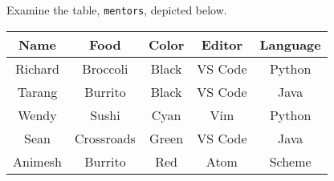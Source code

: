 Examine the table, \texttt{mentors}, depicted below.

\begin{center}
\begin{tabular}{|c|c|c|c|c|}
 \hline
 \textbf{Name} & \textbf{Food} & \textbf{Color} & \textbf{Editor} & \textbf{Language} \\
 \hline
 Richard & Broccoli & Black & VS Code & Python \\
 \hline
 Tarang & Burrito & Black & VS Code & Java \\
 \hline
 Wendy & Sushi & Cyan & Vim & Python \\
 \hline
 Sean & Crossroads & Green & VS Code & Java \\
 \hline
 Animesh & Burrito & Red & Atom & Scheme \\
 \hline
\end{tabular}
\end{center}
